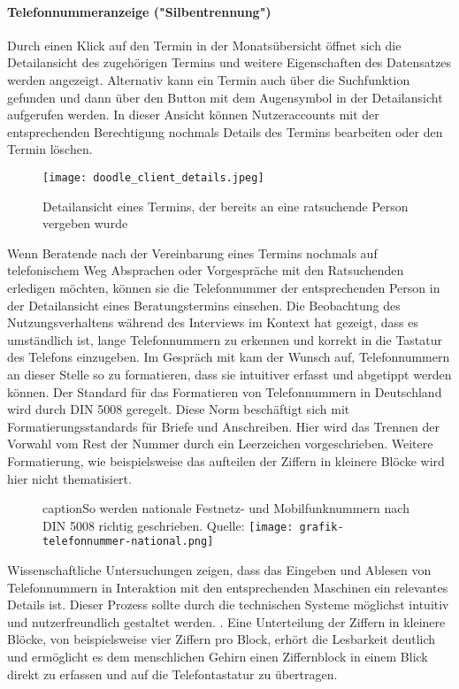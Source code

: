 \paragraph{Telefonnummeranzeige ("Silbentrennung")}

Durch einen Klick auf den Termin in der Monatsübersicht öffnet sich die
Detailansicht des zugehörigen Termins und weitere Eigenschaften des Datensatzes
werden angezeigt. Alternativ kann ein Termin auch über die Suchfunktion
gefunden und dann über den Button mit dem Augensymbol in der Detailansicht
aufgerufen werden. In dieser Ansicht können Nutzeraccounts mit der
entsprechenden Berechtigung nochmals Details des Termins bearbeiten oder den
Termin löschen.

\begin{figure}[H]
    \caption{Detailansicht eines Termins, der bereits an eine ratsuchende Person vergeben wurde}
    \centering
    \texttt{[image: doodle\_client\_details.jpeg]}
\end{figure}

Wenn Beratende nach der Vereinbarung eines Termins nochmals auf telefonischem
Weg Absprachen oder Vorgespräche mit den Ratsuchenden erledigen möchten, können
sie die Telefonnummer der entsprechenden Person in der Detailansicht eines
Beratungstermins einsehen. Die Beobachtung des Nutzungsverhaltens während des
Interviews im Kontext hat gezeigt, dass es umständlich ist, lange
Telefonnummern zu erkennen und korrekt in die Tastatur des Telefons einzugeben.
Im Gespräch mit \ipName kam der Wunsch auf, Telefonnummern an dieser Stelle so
zu formatieren, dass sie intuitiver erfasst und abgetippt werden können. Der
Standard für das Formatieren von Telefonnummern in Deutschland wird durch DIN
5008 geregelt. Diese Norm beschäftigt sich mit Formatierungsstandards für
Briefe und Anschreiben. Hier wird das Trennen der Vorwahl vom Rest der Nummer
durch ein Leerzeichen vorgeschrieben. Weitere Formatierung, wie beispielsweise
das aufteilen der Ziffern in kleinere Blöcke wird hier nicht thematisiert.
\cite{din5008}

\begin{figure}[H]
    caption{So werden nationale Festnetz- und Mobilfunknummern nach DIN 5008 richtig geschrieben. Quelle: \cite{phoneFormatBlog}}
    \centering
    \texttt{[image: grafik-telefonnummer-national.png]}
\end{figure}

Wissenschaftliche Untersuchungen zeigen, dass das Eingeben und Ablesen von
Telefonnummern in Interaktion mit den entsprechenden Maschinen ein relevantes
Details ist. Dieser Prozess sollte durch die technischen Systeme möglichst
intuitiv und nutzerfreundlich gestaltet werden. \cite{humCompPhoneNumbers}.
Eine Unterteilung der Ziffern in kleinere Blöcke, von beispielsweise vier
Ziffern pro Block, erhört die Lesbarkeit deutlich und ermöglicht es dem
menschlichen Gehirn einen Ziffernblock in einem Blick direkt zu erfassen und
auf die Telefontastatur zu übertragen. \cite{phoneFormatBlog}
\cite{numberRecognition} \cite{numberRepres}


